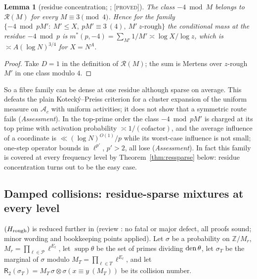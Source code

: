 \documentclass[10pt,reqno]{amsart}
\newtheorem{lemma}[theorem]{Lemma}
\theoremstyle{definition}
\theoremstyle{remark}
\newcommand{\A}{\mathcal A}
\newcommand{\cR}{\mathscr R}
\newcommand{\Z}{\mathbb Z}
\newcommand{\lab}[1]{\textup{[\textsc{#1}]}}
\begin{document}
\begin{lemma}[residue concentration; {\cite[Lemma~4.2]{LS3}}; \lab{proved}]\label{lem:residueconc}
The class $-4\bmod M$ belongs to $\cR(M)$ for every $M\equiv3\pmod4$.  Hence for the
family $\{-4\bmod pM':\ M'\leq X,\ pM'\equiv3\ (4),\ M'\ z\text{-rough}\}$ the conditional
mass at the residue $-4\bmod p$ is
$m^*(p,-4)=\sum_{M'}1/M'\asymp\log X/\log z$, which is $\asymp A(\log N)^{3/4}$ for $X=N^A$.
\end{lemma}
\begin{proof}
Take $D=1$ in the definition of $\cR(M)$; the sum is Mertens over $z$-rough
$M'$ in one class modulo $4$.
\end{proof}
So a fibre family can be dense at one residue although sparse on average.
This defeats the plain Koteck\'y--Preiss criterion for a cluster
expansion of the uniform measure on $\A_c$ with uniform activities; it does
not show that a symmetric route fails (\emph{Assessment}).  In the
top-prime order the class $-4\bmod pM'$ is charged at its top prime with
activation probability $\asymp1/(\text{cofactor})$, and the average influence of
a coordinate is $\ll(\log N)^{O(1)}/p$ while its worst-case influence is not
small; one-step operator bounds in $\ell^{p'}$, $p'>2$, all lose
\cite[\S4.3]{LS3} (\emph{Assessment}).  In fact this family is covered at
every frequency level by Theorem~\ref{thm:ressparse} below: residue
concentration turns out to be the easy case.

\subsection{Damped collisions: residue-sparse mixtures at every level}\label{sec:damped}
$(H_{\rm rough})$ is reduced further in \cite{LS4} (review \cite{LS4rev}: no
fatal or major defect, all proofs sound; minor wording and bookkeeping
points applied).  Let $\sigma$ be a probability on $\Z/M_r$, $M_r=\prod_{\ell\in\mathcal P}\ell^{E_\ell}$,
let $\operatorname{supp}\theta$ be the set of primes dividing ${\rm den}\,\theta$, let $\sigma_T$ be the
marginal of $\sigma$ modulo $M_T=\prod_{\ell\in T}\ell^{E_\ell}$, and let
$\mathsf R_2(\sigma_T)=M_T\,\sigma\otimes\sigma(x\equiv y\ (M_T))$ be its collision number.
\end{document}
